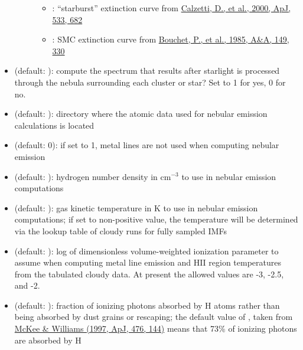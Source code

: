 \documentclass[letterpaper,10pt,english]{sphinxmanual}
\begin{document}
\begin{itemize}
\begin{description}
\begin{itemize}
\item {} 
 : ``starburst'' extinction curve from \href{http://adsabs.harvard.edu/abs/2000ApJ...533..682C}{Calzetti, D., et al., 2000, ApJ, 533, 682}

\item {} 
 : SMC extinction curve from \href{http://adsabs.harvard.edu/abs/1985A\%26A...149..330B}{Bouchet, P., et al., 1985, A\&A, 149, 330}

\end{itemize}

\end{description}

\item {} 
 (default: ): compute the spectrum that results after starlight is processed through the nebula surrounding each cluster or star? Set to 1 for yes, 0 for no.

\item {} 
 (default: ): directory where the atomic data used for nebular emission calculations is located

\item {} 
 (default: 0): if set to 1, metal lines are not used when computing nebular emission

\item {} 
 (default: ): hydrogen number density in \(\mathrm{cm}^{-3}\) to use in nebular emission computations

\item {} 
 (default: ): gas kinetic temperature in K to use in nebular emission computations; if set to non-positive value, the temperature will be determined via the lookup table of cloudy runs for fully sampled IMFs

\item {} 
 (default: ): log of dimensionless volume-weighted ionization parameter to assume when computing metal line emission and HII region temperatures from the tabulated cloudy data. At present the allowed values are -3, -2.5, and -2.

\item {} 
 (default: ): fraction of ionizing photons absorbed by H atoms rather than being absorbed by dust grains or rescaping; the default value of , taken from \href{http://adsabs.harvard.edu/abs/1997ApJ...476..144M}{McKee \& Williams (1997, ApJ, 476, 144)} means that 73\% of ionizing photons are absorbed by H

\end{itemize}
\end{document}
